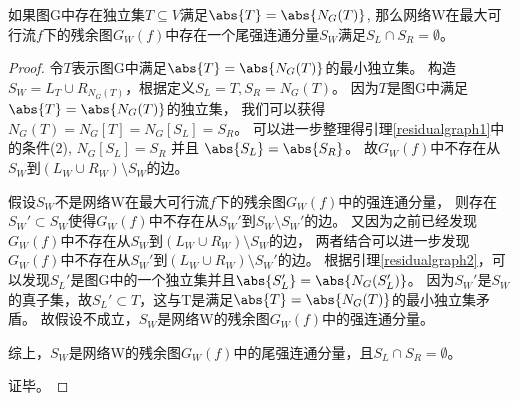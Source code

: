 \begin{lemma} \label{residualgraph3}
如果图G中存在独立集$T \subseteq V$满足$\abs{T} = \abs{N_G(T)}$,
那么网络W在最大可行流$f$下的残余图$G_W(f)$中存在一个尾强连通分量$S_W$满足$S_L \cap S_R = \emptyset$。
\end{lemma}
\begin{proof}
令$T$表示图G中满足$\abs{T} = \abs{N_G(T)}$的最小独立集。
构造$S_W = L_T \cup R_{N_G(T)}$，根据定义$S_L = T, S_R = N_G(T)$。
因为$T$是图G中满足$\abs{T} = \abs{N_G(T)}$的独立集，
我们可以获得$N_G(T) = N_G[T] = N_G[S_L] = S_R$。
可以进一步整理得引理\ref{residualgraph1}中的条件(2), $N_G[S_L] = S_R$ 并且 $\abs{S_L} = \abs{S_R}$。
故$G_W(f)$中不存在从$S_W$到$(L_W \cup R_W) \setminus S_W$的边。

假设$S_W$不是网络W在最大可行流$f$下的残余图$G_W(f)$中的强连通分量，
则存在$S_W' \subset S_W$使得$G_W(f)$中不存在从$S_W'$到$S_W \setminus S_W'$的边。
又因为之前已经发现$G_W(f)$中不存在从$S_W$到$(L_W \cup R_W) \setminus S_W$的边，
两者结合可以进一步发现$G_W(f)$中不存在从$S_W'$到$(L_W \cup R_W) \setminus S_W'$的边。
根据引理\ref{residualgraph2}，可以发现$S_L'$是图G中的一个独立集并且$\abs{S_L'} = \abs{N_G(S_L')}$。
因为$S_W'$是$S_W$的真子集，故$S_L' \subset T$，这与T是满足$\abs{T} = \abs{N_G(T)}$的最小独立集矛盾。
故假设不成立，$S_W$是网络W的残余图$G_W(f)$中的强连通分量。

综上，$S_W$是网络W的残余图$G_W(f)$中的尾强连通分量，且$S_L \cap S_R = \emptyset$。

证毕。
\end{proof}

